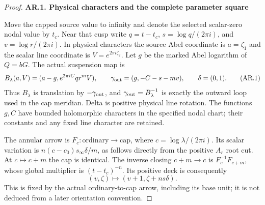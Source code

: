 \begin{proof}
\par

\medskip\noindent\textbf{AR.1. Physical characters and the complete parameter square}

Move the capped source value to infinity and denote the selected
scalar-zero nodal value by \(t_c\). Near that cusp write
\(q=t-t_c\), \(s=\log q/(2\pi i)\), and
\(v=\log r/(2\pi i)\). In physical characters the source
Abel coordinate is \(a=\zeta_1\) and the scalar line coordinate
is \(V=e^{2\pi i\zeta_2}\). Let \(g\) be the marked Abel
logarithm of \(Q=bG\). The actual suspension map is
\[
 B_\lambda(a,V)=(a-g,e^{2\pi iC}qr^mV),\qquad
 \gamma_{\rm out}=(g,-C-s-mv),\qquad \delta=(0,1).
                                                        \tag{AR.1}
\]
Thus \(B_\lambda\) is translation by \(-\gamma_{\rm out}\),
and \(\gamma_{\rm out}=B_\lambda^{-1}\) is exactly the
outward loop used in the cap meridian. Delta is positive physical
line rotation. The functions \(g,C\) have bounded holomorphic
characters in the specified nodal chart; their constants and
any fixed line character are retained.

The annular arrow is \(F_c:\text{ordinary}\to\text{cap}\),
where \(c=\log\lambda/(2\pi i)\). Its scalar variation is
\(n(c-c_0)s_\infty\delta/m\), as follows directly from
the positive \(A_r\) root cut. At \(c\mapsto c+m\) the
cap is identical. The inverse closing \(c+m\to c\) is
\(F_c^{-1}F_{c+m}\), whose global multiplier is
\((t-t_c)^{-n}\). Its positive deck is consequently
\[
              (v,\zeta)\longmapsto(v+1,\zeta+n s\delta).
                                                        \tag{AR.2}
\]
This is fixed by the actual ordinary-to-cap arrow, including its
base unit; it is not deduced from a later orientation convention.


\end{proof}
